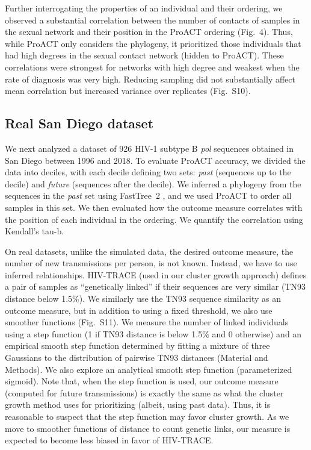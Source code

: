 \documentclass[a4paper,10pt]{article}
\newcommand{\PLWH}{sample\xspace}
\begin{document}
Further interrogating the properties of an individual and their ordering, we observed a substantial correlation between the number of contacts of \PLWH{s} in the sexual network and their position in the ProACT ordering (Fig.~4). 
Thus, while ProACT only considers the phylogeny, it  prioritized those individuals that had high degrees in the sexual contact network (hidden to ProACT). 
These correlations were strongest for networks with high degree and weakest when the rate of diagnosis was very high. 
Reducing sampling did not substantially affect mean correlation but increased variance over replicates (Fig.~S10).





\subsection{Real San Diego dataset}
We next analyzed a dataset of 926 HIV-1 subtype B \textit{pol} sequences obtained in San Diego between 1996 and 2018.
To evaluate ProACT accuracy,
we divided the data into deciles, with each decile defining two sets: \textit{past} (sequences up to the decile) and \textit{future} (sequences after the decile). We inferred a phylogeny from the sequences  in the \textit{past} set using FastTree~2 \supercite{Price2010}, %
and we used ProACT to order all \PLWH{s} in this set. 
We then evaluated how the  outcome measure correlates with the position of each individual in the ordering. 
We quantify the correlation using Kendall's tau-b.

On real datasets, unlike the simulated data, the desired outcome measure, the number of new transmissions per person, is not known. 
Instead, we have to use inferred relationships.
HIV-TRACE (used in our cluster growth approach) defines
a pair of \PLWH{s} as ``genetically linked''
if their sequences are very similar (TN93 distance below 1.5\%).
We similarly use the TN93 sequence similarity as an outcome measure, but in addition to using a fixed threshold, we also use smoother functions (Fig.~S11).
We measure the number of linked individuals using a step function (1 if TN93 distance is below 1.5\% and 0 otherwise) 
and an empirical smooth step function determined by fitting a mixture of three Gaussians to the distribution of pairwise TN93 distances (Material and Methods).
We also explore an analytical smooth step function (parameterized sigmoid).  
Note that, when the step function is used, our outcome measure (computed for future transmissions) is exactly the same as what the cluster growth method uses for prioritizing (albeit, using past data). 
Thus, it is reasonable to suspect that the step function may favor cluster growth. 
As we move to smoother functions of distance to count genetic links, our measure is expected to become less biased in favor of HIV-TRACE. 
\end{document}

